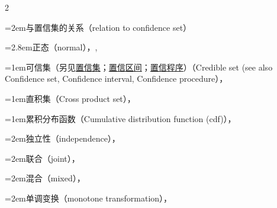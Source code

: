 \begin{multicols}{2}
\par\noindent\hangindent=2em\hspace*{1em}\label{idx:233}与置信集的关系（relation to confidence set）\par
\par\noindent\hangindent=2.8em\hspace*{1.8em}\label{idx:234}正态（normal），\hyperref[idxocc:234:386]{\pageref*{idxocc:234:386}}, \hyperref[exercise:9.32]{\pageref*{exercise:9.32}}\par
\par\addvspace{2pt}
\par\noindent\hangindent=1em\hspace*{0em}\label{idx:235}可信集（另见\hyperref[idx:181]{置信集}；\hyperref[idx:129]{置信区间}；\hyperref[idx:180]{置信程序}）（Credible set (see also Confidence set, Confidence interval, Confidence procedure），\hyperref[eq:9.2.18]{\pageref*{eq:9.2.18}}\par
\par\addvspace{2pt}
\par\noindent\hangindent=1em\hspace*{0em}\label{idx:236}直积集（Cross product set），\hyperref[idxocc:236:157]{\pageref*{idxocc:236:157}}\par
\par\addvspace{2pt}
\par\noindent\hangindent=1em\hspace*{0em}\label{idx:237}累积分布函数（Cumulative distribution function (cdf)），\hyperref[def:1.5.1]{\pageref*{def:1.5.1}}\par
\par\noindent\hangindent=2em\hspace*{1em}\label{idx:238}独立性（independence），\hyperref[exercise:4.9]{\pageref*{exercise:4.9}}\par
\par\noindent\hangindent=2em\hspace*{1em}\label{idx:239}联合（joint），\hyperref[idxocc:239:152]{\pageref*{idxocc:239:152}}\par
\par\noindent\hangindent=2em\hspace*{1em}\label{idx:240}混合（mixed），\hyperref[ex:1.5.6]{\pageref*{ex:1.5.6}}\par
\par\noindent\hangindent=2em\hspace*{1em}\label{idx:241}单调变换（monotone transformation），\hyperref[thm:2.1.3]{\pageref*{thm:2.1.3}}\par

\end{multicols}

